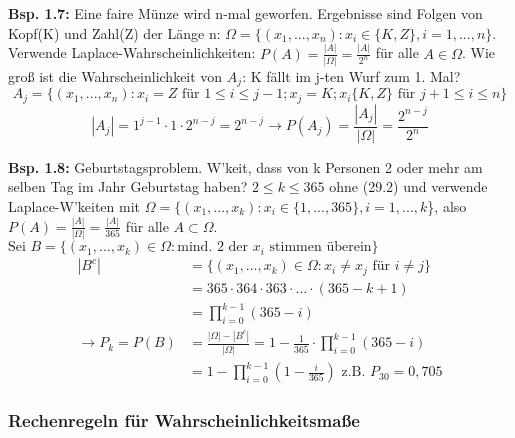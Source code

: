 \documentclass[a4paper,11pt]{article}
\begin{document}
\vspace{6pt}
\noindent\textbf{Bsp. 1.7:} Eine faire Münze wird n-mal geworfen. 
Ergebnisse sind Folgen von Kopf(K) und Zahl(Z) der Länge n: $\Omega = \{(x_1,...,x_n): x_i\in\{K,Z\}, i = 1,...,n\}$. 
Verwende Laplace-Wahrscheinlichkeiten: $P(A)=\frac{|A|}{|\Omega|}=\frac{|A|}{2^n}$ für alle $A\in\Omega$.
Wie groß ist die Wahrscheinlichkeit von $A_j$: \glqq K fällt im j-ten Wurf zum 1. Mal\grqq?
\[A_j = \{(x_1,...,x_n): x_i=Z \text{ für } 1 \leq i \leq j-1; x_j=K; x_i \{K,Z\} \text{ für } j+1 \leq i \leq n\}\]
\[|A_j| = 1^{j-1}\cdot 1\cdot 2^{n-j}=2^{n-j} \rightarrow P(A_j) = \frac{|A_j|}{|\Omega|}= \frac{2^{n-j}}{2^{n}}\]

\noindent\textbf{Bsp. 1.8:} Geburtstagsproblem.
W'keit, dass von k Personen 2 oder mehr am selben Tag im Jahr Geburtstag haben?
$2 \leq k \leq 365$ ohne (29.2) und verwende Laplace-W'keiten mit $\Omega=\{(x_1,...,x_k): x_i \in \{1,...,365\}, i=1,...,k$\}, also 
$P(A)=\frac{|A|}{|\Omega|}=\frac{|A|}{365}$ für alle $A\subset\Omega$.
$\text{Sei }B=\{(x_1,...,x_k) \in\Omega: \text{mind. 2 der } x_i \text{ stimmen überein}\}$
\begin{align*}
    |B^c| &= \{(x_1, \dots ,x_k) \in \Omega: x_i \neq x_j \text{ für }i \neq j\} \\
    &= 365 \cdot 364 \cdot 363 \cdot\dots\cdot (365-k+1) \\
    &= \prod_{i=0}^{k-1}(365-i) \\
    \rightarrow P_k = P(B) &= \frac{|\Omega| - |B^c|}{|\Omega|} = 1 - \frac{1}{365}\cdot \prod_{i=0}^{k-1}(365-i) \\
    &= 1 - \prod_{i=0}^{k-1}(1-\frac{i}{365}) \text{           z.B. } P_{30} = 0,705
\end{align*}

\subsubsection{Rechenregeln für Wahrscheinlichkeitsmaße}
\end{document}

